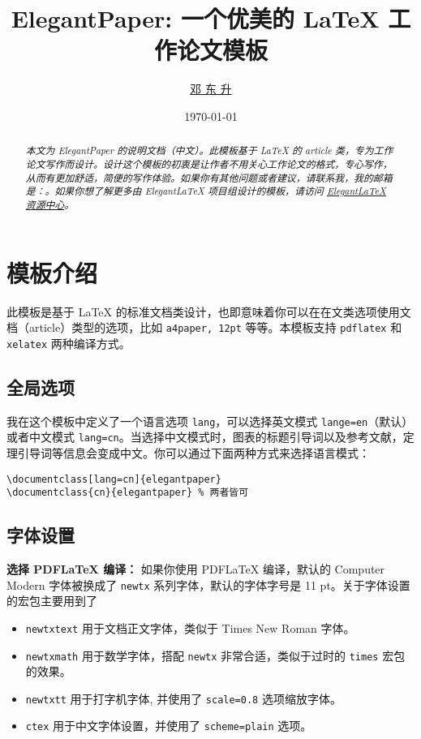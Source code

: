 \documentclass[lang=cn]{elegantpaper}
\title{ElegantPaper: 一个优美的 \LaTeX{} 工作论文模板}
\author{\href{https://ddswhu.me/}{邓 东 升}}
\institute{Elegant\LaTeX{} 项目组}
\date{\today}
\begin{document}
\maketitle

\begin{abstract}
\noindent \itshape 本文为 ElegantPaper 的说明文档（中文）。此模板基于 \LaTeX{} 的 article 类，专为工作论文写作而设计。设计这个模板的初衷是让作者不用关心工作论文的格式，专心写作，从而有更加舒适，简便的写作体验。如果你有其他问题或者建议，请联系我，我的邮箱是：。如果你想了解更多由 Elegant\LaTeX{} 项目组设计的模板，请访问 \href{https://ddswhu.me/resource/}{Elegant\LaTeX{} 资源中心}。
\end{abstract}

\section{模板介绍}

此模板是基于 \LaTeX{} 的标准文档类设计，也即意味着你可以在在文类选项使用文档（article）类型的选项，比如 \texttt{a4paper, 12pt} 等等。本模板支持 \lstinline{pdflatex} 和 \lstinline{xelatex} 两种编译方式。
      
\subsection{全局选项}
我在这个模板中定义了一个语言选项 \lstinline{lang}，可以选择英文模式 \lstinline{lange=en}（默认）或者中文模式 \lstinline{lang=cn}。当选择中文模式时，图表的标题引导词以及参考文献，定理引导词等信息会变成中文。你可以通过下面两种方式来选择语言模式：

\begin{lstlisting}
\documentclass[lang=cn]{elegantpaper}
\documentclass{cn}{elegantpaper} % 两者皆可
\end{lstlisting}

\subsection{字体设置}
\noindent\textbf{选择 PDFLaTeX 编译：} 如果你使用 PDFLaTeX 编译，默认的 Computer Modern 字体被换成了 \lstinline{newtx} 系列字体，默认的字体字号是 11 pt。关于字体设置的宏包主要用到了

\begin{itemize}
	\item \lstinline{newtxtext} 用于文档正文字体，类似于 Times New Roman 字体。
	\item \lstinline{newtxmath} 用于数学字体，搭配 \lstinline{newtx} 非常合适，类似于过时的 \lstinline{times} 宏包的效果。
	\item \lstinline{newtxtt} 用于打字机字体, 并使用了 \lstinline{scale=0.8} 选项缩放字体。
	\item \lstinline{ctex} 用于中文字体设置，并使用了 \lstinline{scheme=plain} 选项。
\end{itemize}
\end{document}
